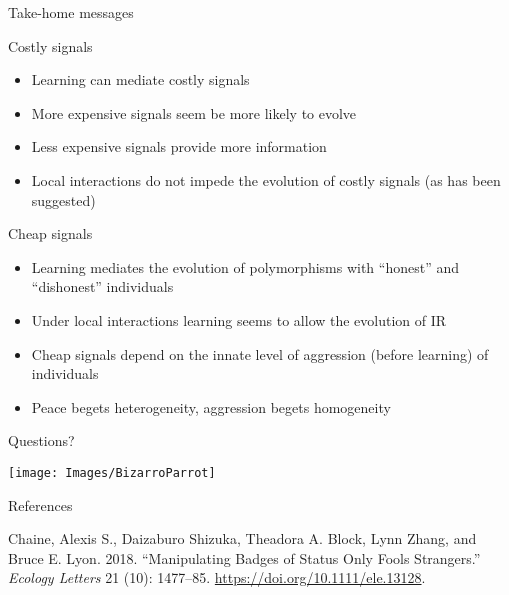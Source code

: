 \documentclass[
  ignorenonframetext,
]{beamer}
\providecommand{\tightlist}{%
  \setlength{\itemsep}{0pt}\setlength{\parskip}{0pt}}
\begin{document}
\begin{frame}{Take-home messages}
\protect\hypertarget{take-home-messages}{}

\begin{block}{Costly signals}

\begin{itemize}
\tightlist
\item
  Learning can mediate costly signals
\item
  More expensive signals seem be more likely to evolve
\item
  Less expensive signals provide more information
\item
  Local interactions do not impede the evolution of costly signals (as
  has been suggested)
\end{itemize}

\end{block}

\begin{block}{Cheap signals}

\begin{itemize}
\tightlist
\item
  Learning mediates the evolution of polymorphisms with ``honest'' and
  ``dishonest'' individuals
\item
  Under local interactions learning seems to allow the evolution of IR
\item
  Cheap signals depend on the innate level of aggression (before
  learning) of individuals
\item
  Peace begets heterogeneity, aggression begets homogeneity
\end{itemize}

\end{block}

\end{frame}

\begin{frame}{Questions?}
\protect\hypertarget{questions}{}

\begin{center}\texttt{[image: Images/BizarroParrot]} \end{center}

\end{frame}

\begin{frame}{References}
\protect\hypertarget{references}{}

\hypertarget{refs}{}
\leavevmode\hypertarget{ref-chaine_Manipulating_2018}{}%
Chaine, Alexis S., Daizaburo Shizuka, Theadora A. Block, Lynn Zhang, and
Bruce E. Lyon. 2018. ``Manipulating Badges of Status Only Fools
Strangers.'' \emph{Ecology Letters} 21 (10): 1477--85.
\url{https://doi.org/10.1111/ele.13128}.

\end{frame}
\end{document}
